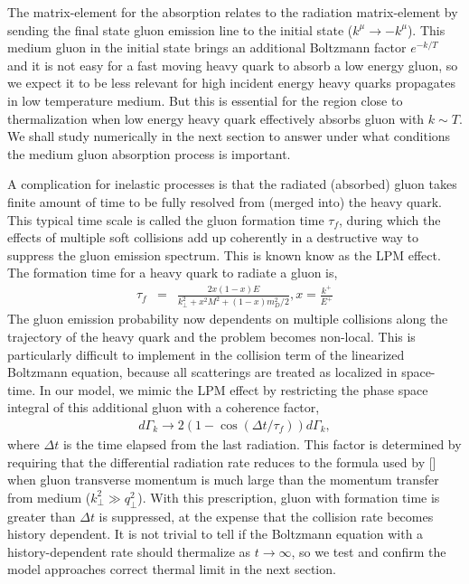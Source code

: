 \documentclass[aps, prc, reprint, amsmath, groupedaddress, nofootinbib]{revtex4-1}
\begin{document}
The matrix-element for the absorption relates to the radiation matrix-element by sending the final state gluon emission line to the initial state ($k^\mu \rightarrow -k^\mu$).
This medium gluon in the initial state brings an additional Boltzmann factor $e^{-k/T}$ and it is not easy for a fast moving heavy quark to absorb a low energy gluon, so we expect it to be less relevant for high incident energy heavy quarks propagates in low temperature medium. 
But this is essential for the region close to thermalization when low energy heavy quark effectively absorbs gluon with $k \sim T$.
We shall study numerically in the next section to answer under what conditions the medium gluon absorption process is important.

A complication for inelastic processes is that the radiated (absorbed) gluon takes finite amount of time to be fully resolved from (merged into) the heavy quark.
This typical time scale is called the gluon formation time $\tau_f$, during which the effects of multiple soft collisions add up coherently in a destructive way to suppress the gluon emission spectrum.
This is known know as the LPM effect.
The formation time for a heavy quark to radiate a gluon is,
\begin{eqnarray}
\tau_f &=& \frac{2x(1-x)E}{k_\perp^2 + x^2M^2 + (1-x)m_D^2/2}, x = \frac{k^+}{E^+}
\end{eqnarray}
The gluon emission probability now dependents on multiple collisions along the trajectory of the heavy quark and the problem becomes non-local.
This is particularly difficult to implement in the collision term of the linearized Boltzmann equation, because all scatterings are treated as localized in space-time.
In our model, we mimic the LPM effect by restricting the phase space integral of this additional gluon with a coherence factor,
\begin{eqnarray}
d\Gamma_k \rightarrow 2\left(1 - \cos\left(\Delta t/\tau_f\right) \right)d\Gamma_k,
\end{eqnarray}
where $\Delta t$ is the time elapsed from the last radiation.
This factor is determined by requiring that the differential radiation rate reduces to the formula used by [] when gluon transverse momentum is much large than the momentum transfer from medium ($k_\perp^2 \gg q_\perp^2$).
With this prescription, gluon with formation time is greater than $\Delta t$ is suppressed, at the expense that the collision rate becomes history dependent.
It is not trivial to tell if the Boltzmann equation with a history-dependent rate should thermalize as $t\rightarrow \infty$, so we test and confirm the model approaches correct thermal limit in the next section.
\end{document}
